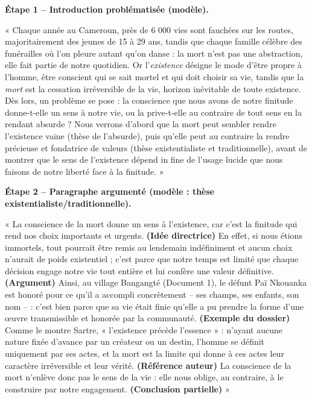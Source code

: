 \documentclass[11pt]{article}
\begin{document}
\begin{exoresolu}
\textbf{Étape 1 -- Introduction problématisée (modèle).}\par
« Chaque année au Cameroun, près de 6 000 vies sont fauchées sur les routes, majoritairement des jeunes de 15 à 29 ans, tandis que chaque famille célèbre des funérailles où l'on pleure autant qu'on danse : la mort n'est pas une abstraction, elle fait partie de notre quotidien. Or l'\emph{existence} désigne le mode d'être propre à l'homme, être conscient qui se sait mortel et qui doit choisir sa vie, tandis que la \emph{mort} est la cessation irréversible de la vie, horizon inévitable de toute existence. Dès lors, un problème se pose : la conscience que nous avons de notre finitude donne-t-elle un sens à notre vie, ou la prive-t-elle au contraire de tout sens en la rendant absurde ? Nous verrons d'abord que la mort peut sembler rendre l'existence vaine (thèse de l'absurde), puis qu'elle peut au contraire la rendre précieuse et fondatrice de valeurs (thèse existentialiste et traditionnelle), avant de montrer que le sens de l'existence dépend in fine de l'usage lucide que nous faisons de notre liberté face à la finitude. »

\textbf{Étape 2 -- Paragraphe argumenté (modèle : thèse existentialiste/traditionnelle).}\par
« La conscience de la mort donne un sens à l'existence, car c'est la finitude qui rend nos choix importants et urgents. \textbf{(Idée directrice)} En effet, si nous étions immortels, tout pourrait être remis au lendemain indéfiniment et aucun choix n'aurait de poids existentiel ; c'est parce que notre temps est limité que chaque décision engage notre vie tout entière et lui confère une valeur définitive. \textbf{(Argument)} Ainsi, au village Bangangté (Document 1), le défunt Paï Nkouanka est honoré pour ce qu'il a accompli concrètement -- ses champs, ses enfants, son nom -- : c'est bien parce que sa vie était finie qu'elle a pu prendre la forme d'une œuvre transmissible et honorée par la communauté. \textbf{(Exemple du dossier)} Comme le montre Sartre, « l'existence précède l'essence » : n'ayant aucune nature fixée d'avance par un créateur ou un destin, l'homme se définit uniquement par ses actes, et la mort est la limite qui donne à ces actes leur caractère irréversible et leur vérité. \textbf{(Référence auteur)} La conscience de la mort n'enlève donc pas le sens de la vie : elle nous oblige, au contraire, à le construire par notre engagement. \textbf{(Conclusion partielle)} »
\end{exoresolu}
\end{document}
